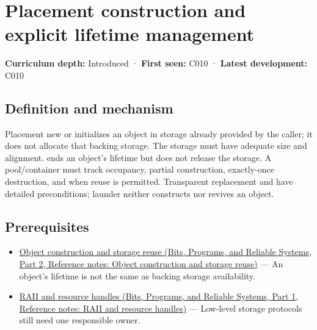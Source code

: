 \hypertarget{appendix-f56c3e43fd4e}{}\label{referencestart:appendix-f56c3e43fd4e}
\section{Placement construction and explicit lifetime management}\label{appendix-f56c3e43fd4e-placement-construction-and-explicit-lifetime-management}

\hypertarget{appendix-f56c3e43fd4e-placement-construction-and-explicit-lifetime-management}{}

\textbf{Curriculum depth:} Introduced · \textbf{First seen:} C010 · \textbf{Latest development:} C010

\begin{allmightroledefinition}

\subsection{Definition and mechanism}\label{appendix-f56c3e43fd4e-definition-and-mechanism}

\hypertarget{appendix-f56c3e43fd4e-definition-and-mechanism}{}

Placement new or  initializes an object in storage already provided by the caller; it does not allocate that backing storage. The storage must have adequate size and alignment.  ends an object's lifetime but does not release the storage. A pool/container must track occupancy, partial construction, exactly-once destruction, and when reuse is permitted. Transparent replacement and  have detailed preconditions; launder neither constructs nor revives an object.

\end{allmightroledefinition}

\subsection{Prerequisites}\label{appendix-f56c3e43fd4e-prerequisites}

\hypertarget{appendix-f56c3e43fd4e-prerequisites}{}

\begin{itemize}
\tightlist
\item
  \href{../01-Bits-Programs-and-Reliable-Systems-P02/main.pdf\#appendix-a82f9c438857}{Object construction and storage reuse (Bits, Programs, and Reliable Systems, Part 2, Reference notes: Object construction and storage reuse)} --- An object's lifetime is not the same as backing storage availability.
\item
  \href{../01-Bits-Programs-and-Reliable-Systems-P01/main.pdf\#appendix-69739d3ab49b}{RAII and resource handles (Bits, Programs, and Reliable Systems, Part 1, Reference notes: RAII and resource handles)} --- Low-level storage protocols still need one responsible owner.
\end{itemize}

